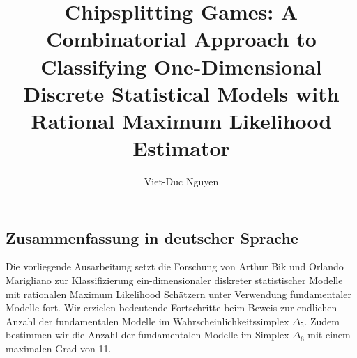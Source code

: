 \documentclass[masters]{ucbthesis}
\theoremstyle{definition}
\begin{document}

\title{Chipsplitting Games: A Combinatorial Approach to Classifying One-Dimensional Discrete Statistical Models with Rational Maximum Likelihood Estimator}
\author{Viet-Duc Nguyen}


\maketitle
\copyrightpage

\begin{alwayssingle}
\section*{Zusammenfassung in deutscher Sprache}

Die vorliegende Ausarbeitung setzt die Forschung von Arthur Bik und Orlando Marigliano zur Klassifizierung ein-dimensionaler diskreter statistischer Modelle mit rationalen Maximum Likelihood Schätzern unter Verwendung fundamentaler Modelle fort. Wir erzielen bedeutende Fortschritte beim Beweis zur endlichen Anzahl der fundamentalen Modelle im Wahrscheinlichkeitssimplex \( \Delta_5 \). Zudem bestimmen wir die Anzahl der fundamentalen Modelle im Simplex \( \Delta_6 \) mit einem maximalen Grad von 11.

\end{alwayssingle}
\end{document}
